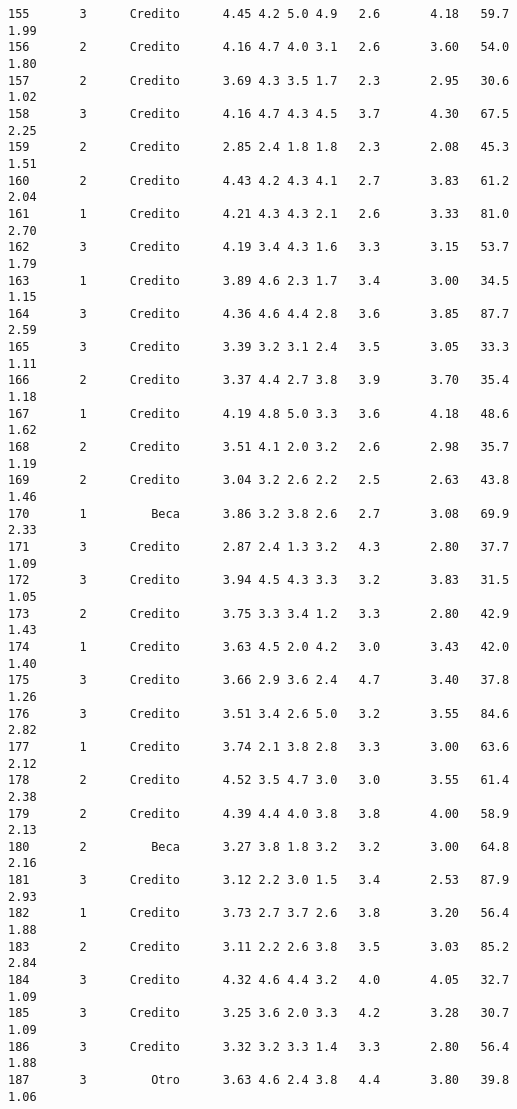 \documentclass[
  letterpaper,
  DIV=11,
  numbers=noendperiod]{scrartcl}
\begin{document}
\begin{verbatim}
155       3      Credito      4.45 4.2 5.0 4.9   2.6       4.18   59.7    1.99
156       2      Credito      4.16 4.7 4.0 3.1   2.6       3.60   54.0    1.80
157       2      Credito      3.69 4.3 3.5 1.7   2.3       2.95   30.6    1.02
158       3      Credito      4.16 4.7 4.3 4.5   3.7       4.30   67.5    2.25
159       2      Credito      2.85 2.4 1.8 1.8   2.3       2.08   45.3    1.51
160       2      Credito      4.43 4.2 4.3 4.1   2.7       3.83   61.2    2.04
161       1      Credito      4.21 4.3 4.3 2.1   2.6       3.33   81.0    2.70
162       3      Credito      4.19 3.4 4.3 1.6   3.3       3.15   53.7    1.79
163       1      Credito      3.89 4.6 2.3 1.7   3.4       3.00   34.5    1.15
164       3      Credito      4.36 4.6 4.4 2.8   3.6       3.85   87.7    2.59
165       3      Credito      3.39 3.2 3.1 2.4   3.5       3.05   33.3    1.11
166       2      Credito      3.37 4.4 2.7 3.8   3.9       3.70   35.4    1.18
167       1      Credito      4.19 4.8 5.0 3.3   3.6       4.18   48.6    1.62
168       2      Credito      3.51 4.1 2.0 3.2   2.6       2.98   35.7    1.19
169       2      Credito      3.04 3.2 2.6 2.2   2.5       2.63   43.8    1.46
170       1         Beca      3.86 3.2 3.8 2.6   2.7       3.08   69.9    2.33
171       3      Credito      2.87 2.4 1.3 3.2   4.3       2.80   37.7    1.09
172       3      Credito      3.94 4.5 4.3 3.3   3.2       3.83   31.5    1.05
173       2      Credito      3.75 3.3 3.4 1.2   3.3       2.80   42.9    1.43
174       1      Credito      3.63 4.5 2.0 4.2   3.0       3.43   42.0    1.40
175       3      Credito      3.66 2.9 3.6 2.4   4.7       3.40   37.8    1.26
176       3      Credito      3.51 3.4 2.6 5.0   3.2       3.55   84.6    2.82
177       1      Credito      3.74 2.1 3.8 2.8   3.3       3.00   63.6    2.12
178       2      Credito      4.52 3.5 4.7 3.0   3.0       3.55   61.4    2.38
179       2      Credito      4.39 4.4 4.0 3.8   3.8       4.00   58.9    2.13
180       2         Beca      3.27 3.8 1.8 3.2   3.2       3.00   64.8    2.16
181       3      Credito      3.12 2.2 3.0 1.5   3.4       2.53   87.9    2.93
182       1      Credito      3.73 2.7 3.7 2.6   3.8       3.20   56.4    1.88
183       2      Credito      3.11 2.2 2.6 3.8   3.5       3.03   85.2    2.84
184       3      Credito      4.32 4.6 4.4 3.2   4.0       4.05   32.7    1.09
185       3      Credito      3.25 3.6 2.0 3.3   4.2       3.28   30.7    1.09
186       3      Credito      3.32 3.2 3.3 1.4   3.3       2.80   56.4    1.88
187       3         Otro      3.63 4.6 2.4 3.8   4.4       3.80   39.8    1.06

\end{verbatim}
\end{document}
